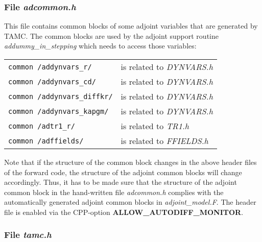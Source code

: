 \subsubsection{File {\it adcommon.h}}
\label{www:tutorials}

This file contains common blocks of some adjoint variables
that are generated by TAMC. 
The common blocks are used by the adjoint support routine
{\it addummy\_in\_stepping} which needs to access those variables:

\begin{tabular}{ll}
\hspace*{4ex} {\tt common /addynvars\_r/} &
\hspace*{4ex} is related to {\it DYNVARS.h} \\
\hspace*{4ex} {\tt common /addynvars\_cd/} &
\hspace*{4ex} is related to {\it DYNVARS.h} \\
\hspace*{4ex} {\tt common /addynvars\_diffkr/} &
\hspace*{4ex} is related to {\it DYNVARS.h} \\
\hspace*{4ex} {\tt common /addynvars\_kapgm/} &
\hspace*{4ex} is related to {\it DYNVARS.h} \\
\hspace*{4ex} {\tt common /adtr1\_r/} &
\hspace*{4ex} is related to {\it TR1.h} \\
\hspace*{4ex} {\tt common /adffields/} &
\hspace*{4ex} is related to {\it FFIELDS.h}\\
\end{tabular}

Note that if the structure of the common block changes in the 
above header files of the forward code, the structure
of the adjoint common blocks will change accordingly.
Thus, it has to be made sure that the structure of the
adjoint common block in the hand-written file {\it adcommon.h}
complies with the automatically generated adjoint common blocks
in {\it adjoint\_model.F}.
The header file is enabled via the CPP-option
{\bf ALLOW\_AUTODIFF\_MONITOR}.

\subsubsection{File {\it tamc.h}}
\label{www:tutorials}

